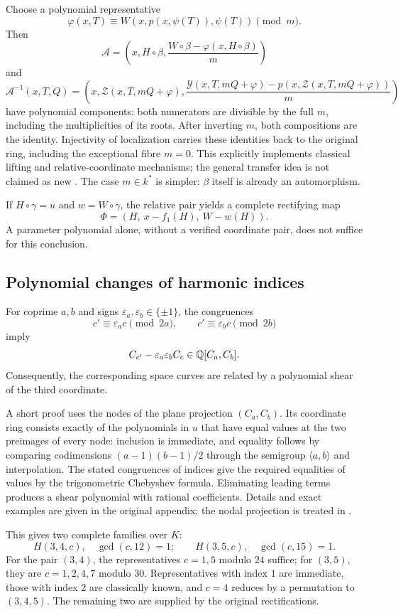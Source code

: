 Choose a polynomial representative
\[
\varphi(x,T)\equiv W(x,p(x,\psi(T)),\psi(T))\pmod m.
\]
Then
\[
\mathcal A=\left(x,H\circ\beta,
\frac{W\circ\beta-\varphi(x,H\circ\beta)}m\right)
\]
and
\[
\mathcal A^{-1}(x,T,Q)=
\left(x,\mathcal Z(x,T,mQ+\varphi),
\frac{\mathcal Y(x,T,mQ+\varphi)-p(x,\mathcal Z(x,T,mQ+\varphi))}m\right)
\]
have polynomial components: both numerators are divisible by the full $m$,
including the multiplicities of its roots. After inverting $m$, both
compositions are the identity. Injectivity of localization carries these
identities back to the original ring, including the exceptional fibre $m=0$.
This explicitly implements classical lifting and relative-coordinate
mechanisms; the general transfer idea is not claimed as new \cite{EVM,Repository}.
The case $m\in k^*$ is simpler: $\beta$ itself is already an automorphism.

If $H\circ\gamma=u$ and $w=W\circ\gamma$, the relative pair yields
a complete rectifying map
\[
\Phi=(H,\ x-f_1(H),\ W-w(H)).
\]
A parameter polynomial alone, without a verified coordinate pair,
does not suffice for this conclusion.

\subsection{Polynomial changes of harmonic indices}
For coprime $a,b$ and signs $\varepsilon_a,\varepsilon_b\in\{\pm1\}$,
the congruences
\[
c'\equiv\varepsilon_a c\pmod{2a},\qquad
c'\equiv\varepsilon_b c\pmod{2b}
\]
imply
\[
C_{c'}-\varepsilon_a\varepsilon_b C_c\in{\mathbb{Q}}[C_a,C_b].
\]
Consequently, the corresponding space curves are related by
a polynomial shear of the third coordinate.

A short proof uses the nodes of the plane projection $(C_a,C_b)$.
Its coordinate ring consists exactly of the polynomials in $u$ that have
equal values at the two preimages of every node: inclusion is immediate,
and equality follows by comparing codimensions
$(a-1)(b-1)/2$ through the semigroup $\langle a,b\rangle$ and interpolation.
The stated congruences of indices give the required equalities of values
by the trigonometric Chebyshev formula. Eliminating leading terms produces
a shear polynomial with rational coefficients. Details and exact examples
are given in the original appendix; the nodal projection is treated in \cite{FF}.

This gives two complete families over $K$:
\[
H(3,4,c),\quad\gcd(c,12)=1;
\qquad H(3,5,c),\quad\gcd(c,15)=1.
\]
For the pair $(3,4)$, the representatives $c=1,5$ modulo $24$ suffice;
for $(3,5)$, they are $c=1,2,4,7$ modulo $30$. Representatives with index
$1$ are immediate, those with index $2$ are classically known, and $c=4$
reduces by a permutation to $(3,4,5)$. The remaining two are supplied
by the original rectifications.

